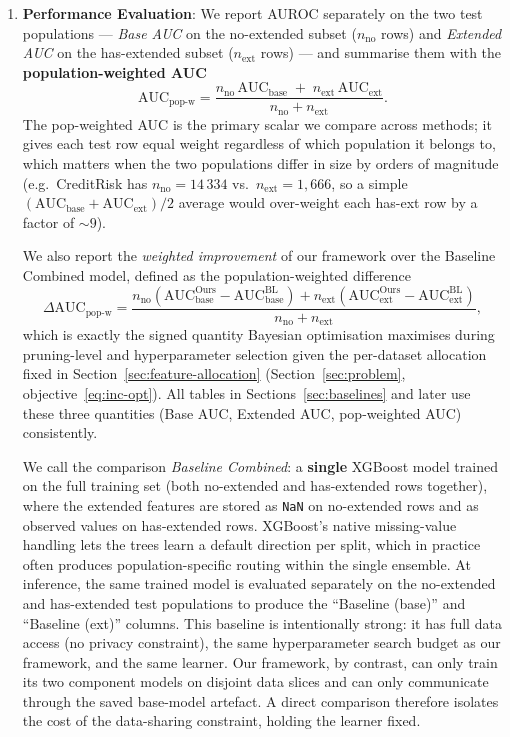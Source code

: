 \documentclass[sigconf]{acmart}
\begin{document}
\begin{itemize}
\begin{enumerate}
\item \textbf{Performance Evaluation}: We report AUROC separately on the two test populations — \emph{Base AUC} on the no-extended subset ($n_{\text{no}}$ rows) and \emph{Extended AUC} on the has-extended subset ($n_{\text{ext}}$ rows) — and summarise them with the \textbf{population-weighted AUC}
\begin{equation}
\label{eq:pop-weighted-auc}
\mathrm{AUC}_{\text{pop-w}}
=\frac{n_{\text{no}}\,\mathrm{AUC}_{\text{base}}\;+\;n_{\text{ext}}\,\mathrm{AUC}_{\text{ext}}}{n_{\text{no}}+n_{\text{ext}}}.
\end{equation}
The pop-weighted AUC is the primary scalar we compare across methods; it gives each test row equal weight regardless of which population it belongs to, which matters when the two populations differ in size by orders of magnitude (e.g.\ CreditRisk has $n_{\text{no}}{=}14\,334$ vs.\ $n_{\text{ext}}{=}1{,}666$, so a simple $(\mathrm{AUC}_{\text{base}}+\mathrm{AUC}_{\text{ext}})/2$ average would over-weight each has-ext row by a factor of $\sim 9$).

We also report the \emph{weighted improvement} of our framework over the Baseline Combined model, defined as the population-weighted difference
\begin{equation}
\label{eq:weighted-improvement}
\Delta\mathrm{AUC}_{\text{pop-w}}
=\frac{n_{\text{no}}(\mathrm{AUC}^{\text{Ours}}_{\text{base}}-\mathrm{AUC}^{\text{BL}}_{\text{base}})+n_{\text{ext}}(\mathrm{AUC}^{\text{Ours}}_{\text{ext}}-\mathrm{AUC}^{\text{BL}}_{\text{ext}})}{n_{\text{no}}+n_{\text{ext}}},
\end{equation}
which is exactly the signed quantity Bayesian optimisation maximises during pruning-level and hyperparameter selection given the per-dataset allocation fixed in Section~\ref{sec:feature-allocation} (Section~\ref{sec:problem}, objective~\eqref{eq:inc-opt}). All tables in Sections~\ref{sec:baselines} and later use these three quantities (Base AUC, Extended AUC, pop-weighted AUC) consistently.

We call the comparison \emph{Baseline Combined}: a \textbf{single} XGBoost model trained on the full training set (both no-extended and has-extended rows together), where the extended features are stored as \texttt{NaN} on no-extended rows and as observed values on has-extended rows. XGBoost's native missing-value handling lets the trees learn a default direction per split, which in practice often produces population-specific routing within the single ensemble. At inference, the same trained model is evaluated separately on the no-extended and has-extended test populations to produce the ``Baseline (base)'' and ``Baseline (ext)'' columns. This baseline is intentionally strong: it has full data access (no privacy constraint), the same hyperparameter search budget as our framework, and the same learner. Our framework, by contrast, can only train its two component models on disjoint data slices and can only communicate through the saved base-model artefact. A direct comparison therefore isolates the cost of the data-sharing constraint, holding the learner fixed.


\end{enumerate}
\end{itemize}
\end{document}
